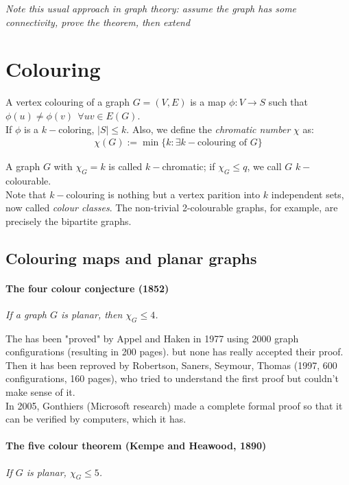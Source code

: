 \documentclass[11pt]{book}
\begin{document}
		\textit{Note this usual approach in graph theory: assume the graph has some connectivity, prove the theorem, then extend}
		
		
\chapter{Colouring}
A vertex colouring of a graph $G = (V,E)$ is a map $\phi: V \rightarrow S$ such that $\phi(u) \neq \phi(v) ~~\forall uv \in E(G)$.\\

If $\phi$ is a $k-$coloring, $|S| \leq k$. Also, we define the \textit{chromatic number} $\chi$ as:
\begin{eqnarray}
	\chi (G) := \min \{ k : \exists k-\text{colouring of }G \}
\end{eqnarray}

A graph $G$ with $\chi_{G} = k$ is called $k-$chromatic; if $\chi_{G} \leq q$, we call $G$ $k-$colourable.\\

Note that $k-$colouring is nothing but a vertex parition into $k$ independent sets, now called \textit{colour classes}. The non-trivial 2-colourable graphs, for example, are precisely the bipartite graphs.

	\section{Colouring maps and planar graphs}
		\subsubsection{The four colour conjecture (1852)}
		\textit{If a graph $G$ is planar, then $\chi_{G} \leq 4$.	\\}
		
		The has been "proved" by Appel and Haken in 1977 using 2000 graph configurations (resulting in 200 pages). but none has really accepted their proof. \\
		
		Then it has been reproved by Robertson, Saners, Seymour, Thomas (1997, 600 configurations, 160 pages), who tried to understand the first proof but couldn't make sense of it. \\
		
		In 2005, Gonthiers (Microsoft research) made a complete formal proof so that it can be verified by computers, which it has.
		
		\subsubsection{The five colour theorem (Kempe and Heawood, 1890)}
		\textit{If $G$ is planar, $\chi_{G} \leq 5$.\\}
		
\end{document}
